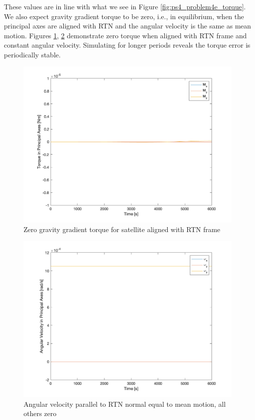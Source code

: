 These values are in line with what we see in Figure \ref{fig:ps4_problem4e_torque}. We also expect gravity gradient torque to be zero, i.e., in equilibrium, when the principal axes are aligned with RTN and the angular velocity is the same as mean motion. Figures \ref{fig:ps4_problem4d_torque}, \ref{fig:ps4_problem4d_angvel} demonstrate zero torque when aligned with RTN frame and constant angular velocity. Simulating for longer periods reveals the torque error is periodically stable.

\begin{figure}[H]
\centering
\includegraphics[scale=0.6]{Images/ps4_problem4d_torque.png}
\caption{Zero gravity gradient torque for satellite aligned with RTN frame}
\label{fig:ps4_problem4d_torque}
\end{figure}

\begin{figure}[H]
\centering
\includegraphics[scale=0.6]{Images/ps4_problem4d_angvel.png}
\caption{Angular velocity parallel to RTN normal equal to mean motion, all others zero}
\label{fig:ps4_problem4d_angvel}
\end{figure}

